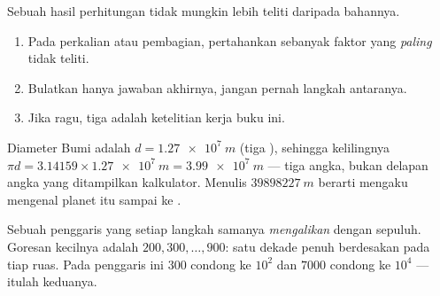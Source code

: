 \begin{method}\label{met:g10:orders-of-magnitude:sigfig}
Sebuah hasil perhitungan tidak mungkin lebih teliti daripada bahannya.
\begin{enumerate}
  \item Pada perkalian atau pembagian, pertahankan 
        sebanyak  faktor yang \emph{paling} tidak teliti.
  \item Bulatkan hanya jawaban akhirnya, jangan pernah langkah
        antaranya.
  \item Jika ragu, tiga  adalah ketelitian kerja buku ini.
\end{enumerate}
\end{method}

\begin{example}\label{ex:g10:orders-of-magnitude:sigfig}
Diameter Bumi adalah $d = \qty{1.27e7}{m}$ (tiga ),
sehingga kelilingnya
$\pi d = \num{3.14159} \times \qty{1.27e7}{m} = \qty{3.99e7}{m}$ ---
tiga angka, bukan delapan angka yang ditampilkan kalkulator. Menulis
$\qty{39898227}{m}$ berarti mengaku mengenal planet itu sampai ke
.
\end{example}

\begin{omfigure}

{\small Sebuah penggaris yang setiap langkah samanya \emph{mengalikan}
dengan sepuluh. Goresan kecilnya adalah $200, 300, \dots, 900$: satu
dekade penuh berdesakan pada tiap ruas. Pada penggaris ini $\num{300}$
condong ke $10^{2}$ dan $\num{7000}$ condong ke $10^{4}$ --- itulah
 keduanya.}
\end{omfigure}

